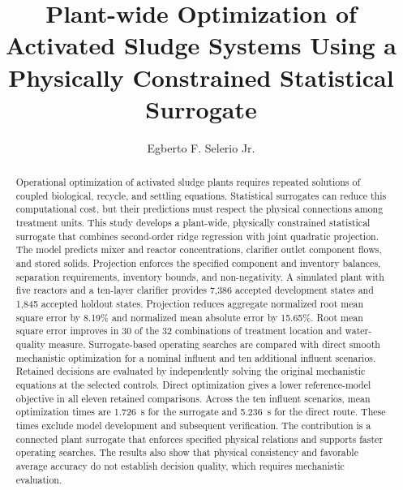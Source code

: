 \documentclass[a4paper,fleqn]{cas-sc}
\begin{document}
\let\WriteBookmarks\relax
\def\floatpagepagefraction{1}
\def\textpagefraction{.001}


\title[mode=title,size=\Large]{Plant-wide Optimization of Activated Sludge Systems Using a Physically Constrained Statistical Surrogate}

\author[1]{Egberto F. Selerio Jr.}
\cormark[1]



\begin{abstract}
Operational optimization of activated sludge plants requires repeated solutions of coupled biological, recycle, and settling equations. Statistical surrogates can reduce this computational cost, but their predictions must respect the physical connections among treatment units. This study develops a plant-wide, physically constrained statistical surrogate that combines second-order ridge regression with joint quadratic projection. The model predicts mixer and reactor concentrations, clarifier outlet component flows, and stored solids. Projection enforces the specified component and inventory balances, separation requirements, inventory bounds, and non-negativity. A simulated plant with five reactors and a ten-layer clarifier provides 7,386 accepted development states and 1,845 accepted holdout states. Projection reduces aggregate normalized root mean square error by 8.19\% and normalized mean absolute error by 15.65\%. Root mean square error improves in 30 of the 32 combinations of treatment location and water-quality measure. Surrogate-based operating searches are compared with direct smooth mechanistic optimization for a nominal influent and ten additional influent scenarios. Retained decisions are evaluated by independently solving the original mechanistic equations at the selected controls. Direct optimization gives a lower reference-model objective in all eleven retained comparisons. Across the ten influent scenarios, mean optimization times are 1.726~s for the surrogate and 5.236~s for the direct route. These times exclude model development and subsequent verification. The contribution is a connected plant surrogate that enforces specified physical relations and supports faster operating searches. The results also show that physical consistency and favorable average accuracy do not establish decision quality, which requires mechanistic evaluation.
\end{abstract}
\end{document}

